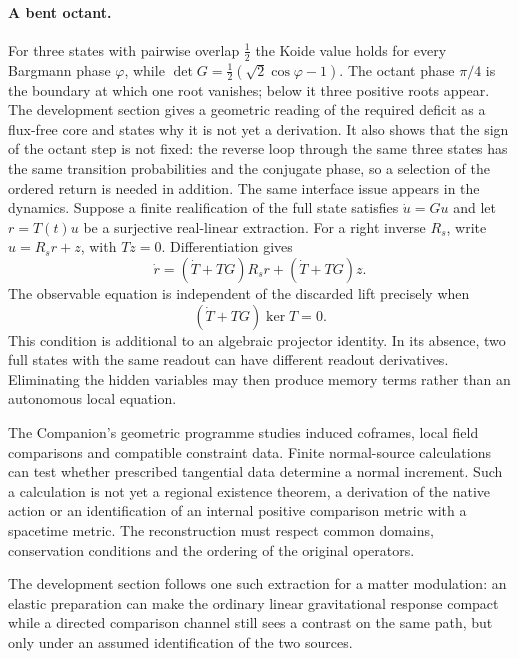 \paragraph{A bent octant.}
For three states with pairwise overlap $\tfrac12$ the Koide value holds for
every Bargmann phase $\varphi$, while $\det G=\tfrac12(\sqrt2\cos\varphi-1)$.
The octant phase $\pi/4$ is the boundary at which one root vanishes;
below it three positive roots appear. The development section gives a
geometric reading of the required deficit as a flux-free core and
states why it is not yet a derivation. It also shows that the sign of
the octant step is not fixed: the reverse loop through the same three
states has the same transition probabilities and the conjugate phase,
so a selection of the ordered return is needed in addition.
The same interface issue appears in the dynamics. Suppose a finite
realification of the full state satisfies $\dot u=Gu$ and let
$r=T(t)u$ be a surjective real-linear extraction. For a right inverse
$R_s$, write $u=R_sr+z$, with $Tz=0$. Differentiation gives
\begin{equation}
 \dot r=(\dot T+TG)R_sr+(\dot T+TG)z.
\end{equation}
The observable equation is independent of the discarded lift precisely
when
\begin{equation}
 (\dot T+TG)\ker T=0.
\end{equation}
This condition is additional to an algebraic projector identity. In its
absence, two full states with the same readout can have different
readout derivatives. Eliminating the hidden variables may then produce
memory terms rather than an autonomous local equation.

The Companion's geometric programme studies induced coframes, local
field comparisons and compatible constraint data. Finite normal-source
calculations can test whether prescribed tangential data determine a
normal increment. Such a calculation is not yet a regional existence
theorem, a derivation of the native action or an identification of an
internal positive comparison metric with a spacetime metric. The
reconstruction must respect common domains, conservation conditions
and the ordering of the original operators.

The development section follows one such extraction for a matter
modulation: an elastic preparation can make the ordinary linear
gravitational response compact while a directed comparison channel
still sees a contrast on the same path, but only under an assumed
identification of the two sources.

